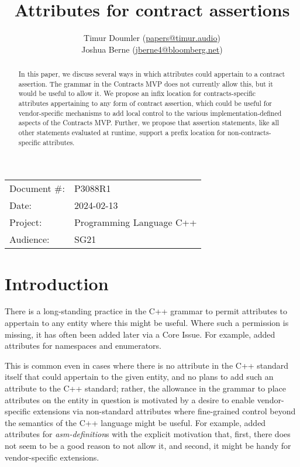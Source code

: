 

 \usepackage[bottom]{footmisc} 


\title{Attributes for contract assertions}
\author{ Timur Doumler \small(\href{mailto:papers@timur.audio}{papers@timur.audio})  \\
Joshua Berne \small(\href{mailto:jberne4@bloomberg.net}{jberne4@bloomberg.net})
}
\date{}
\maketitle

\begin{tabular}{ll}
Document \#: & P3088R1 \\
Date: &2024-02-13 \\
Project: & Programming Language C++ \\
Audience: & SG21
\end{tabular}

\begin{abstract}
In this paper, we discuss several ways in which attributes could appertain to a contract assertion. The grammar in the Contracts MVP does not currently allow this, but it would be useful to allow it. We propose an infix location for contracts-specific attributes appertaining to any form of contract assertion, which could be useful for vendor-specific mechanisms to add local control to the various implementation-defined aspects of the Contracts MVP.  Further, we propose that assertion statements, like all other statements evaluated at runtime, support a prefix location for non-contracts-specific attributes.
\end{abstract}

\section{Introduction}
\label{sec:intro}

There is a long-standing practice in the C++ grammar to permit attributes to appertain to any entity where this might be useful. Where such a permission is missing, it has often been added later via a Core Issue. For example, \cite{CWG1657} added attributes for namespaces and enumerators.

This is common even in cases where there is no attribute in the C++ standard itself that could appertain to the given entity, and no plans to add such an attribute to the C++ standard; rather, the allowance in the grammar to place attributes on the entity in question is motivated by a desire to enable vendor-specific extensions via non-standard attributes where fine-grained control beyond the semantics of the C++ language might be useful. For example, \cite{CWG2262} added attributes for \emph{asm-definition}s with the explicit motivation that, first, there does not seem to be a good reason to not allow it, and second, it might be handy for vendor-specific extensions.

